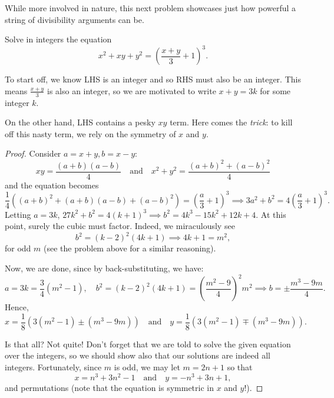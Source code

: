 \documentclass[../jarvis.tex]{subfiles}
\begin{document}
While more involved in nature, this next problem showcases just how powerful a string of divisibility arguments can be.
\begin{example}
Solve in integers the equation
$$x^2+xy+y^2=\left(\frac{x+y}{3}+1\right)^3.$$
\end{example}
To start off, we know LHS is an integer and so RHS must also be an integer. This means $\frac{x+y}{3}$ is also an integer, so we are motivated to write $x+y=3k$ for some integer $k$.

On the other hand, LHS contains a pesky $xy$ term. Here comes the \textit{trick}: to kill off this nasty term, we rely on the symmetry of $x$ and $y$. 
\begin{proof}
    Consider $a=x+y, b=x-y$:
    $$xy= \frac{(a+b)(a-b)}{4} \quad\text{and}\quad x^2+y^2= \frac{(a+b)^2+(a-b)^2}{4}$$
and the equation becomes
$$\frac{1}{4}\left((a+b)^2+(a+b)(a-b)+(a-b)^2\right)=\left(\frac{a}{3}+1\right)^3 \implies 3a^2+b^2=4\left(\frac{a}{3}+1\right)^3.$$
Letting $a=3k$, $27k^2+b^2=4(k+1)^3 \implies b^2=4k^3-15k^2+12k+4$.
At this point, surely the cubic must factor. Indeed, we miraculously see
$$b^2=(k-2)^2(4k+1) \implies 4k+1=m^2,$$
for odd $m$ (see the problem above for a similar reasoning).

Now, we are done, since by back-substituting, we have:
$$a=3k=\frac{3}{4}(m^2-1), \quad b^2=(k-2)^2(4k+1)=\left(\frac{m^2-9}{4}\right)^2m^2 \implies b=\pm \frac{m^3-9m}{4}.$$
Hence,
$$x=\frac{1}{8}\left(3(m^2-1)\pm(m^3-9m)\right)\quad\text{and}\quad y=\frac{1}{8}\left(3(m^2-1)\mp(m^3-9m)\right).$$

Is that all? Not quite! Don't forget that we are told to solve the given equation over the integers, so we should show also that our solutions are indeed all integers. Fortunately, since $m$ is odd, we may let $m=2n+1$ so that
$$\boxed{x=n^3+3n^2-1\quad\text{and}\quad y=-n^3+3n+1},$$
and permutations (note that the equation is symmetric in $x$ and $y$!).
\end{proof}
\end{document}
